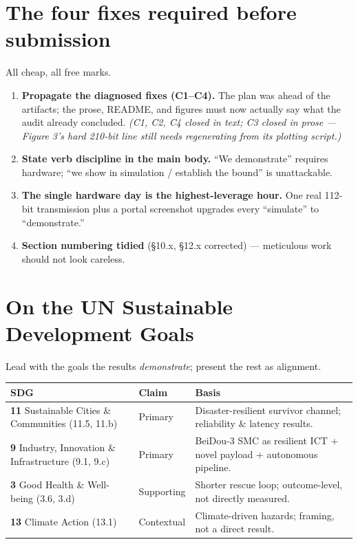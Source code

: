 \documentclass[11pt,a4paper]{article}
\newcommand{\sdg}[1]{\textbf{\color{band}#1}}
\begin{document}
\section*{The four fixes required before submission}
All cheap, all free marks.
\begin{enumerate}[leftmargin=1.6em,itemsep=3pt]
  \item \textbf{Propagate the diagnosed fixes (C1--C4).} The plan was ahead of the
        artifacts; the prose, README, and figures must now actually say what the audit
        already concluded. \emph{(C1, C2, C4 closed in text; C3 closed in prose ---
        Figure 3's hard 210-bit line still needs regenerating from its plotting script.)}
  \item \textbf{State verb discipline in the main body.} ``We demonstrate'' requires
        hardware; ``we show in simulation / establish the bound'' is unattackable.
  \item \textbf{The single hardware day is the highest-leverage hour.} One real 112-bit
        transmission plus a portal screenshot upgrades every ``simulate'' to ``demonstrate.''
  \item \textbf{Section numbering tidied} (\S10.x, \S12.x corrected) --- meticulous work
        should not look careless.
\end{enumerate}

\section*{On the UN Sustainable Development Goals}
Lead with the goals the results \emph{demonstrate}; present the rest as alignment.

\begin{center}
\renewcommand{\arraystretch}{1.3}
\begin{tabular}{@{}>{\raggedright}p{4.4cm} p{2.0cm} p{6.4cm}@{}}
\toprule
\textbf{SDG} & \textbf{Claim} & \textbf{Basis} \\
\midrule
\sdg{11} Sustainable Cities \& Communities (11.5, 11.b) & Primary &
  Disaster-resilient survivor channel; reliability \& latency results. \\
\sdg{9} Industry, Innovation \& Infrastructure (9.1, 9.c) & Primary &
  BeiDou-3 SMC as resilient ICT + novel payload + autonomous pipeline. \\
\sdg{3} Good Health \& Well-being (3.6, 3.d) & Supporting &
  Shorter rescue loop; outcome-level, not directly measured. \\
\sdg{13} Climate Action (13.1) & Contextual &
  Climate-driven hazards; framing, not a direct result. \\
\bottomrule
\end{tabular}
\end{center}
\end{document}

